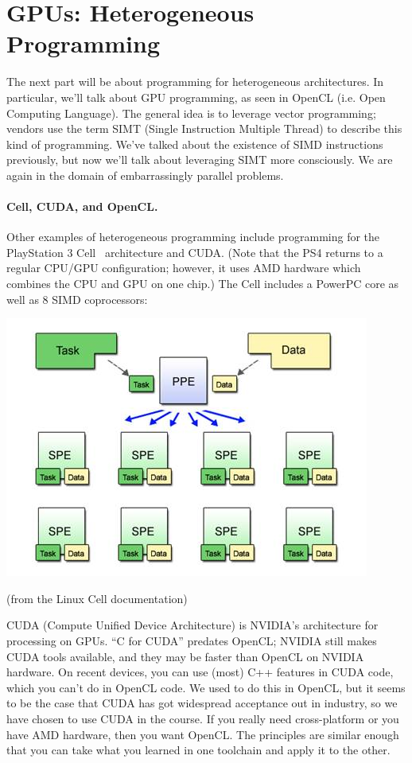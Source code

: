 




\section*{GPUs: Heterogeneous Programming}

The next part will be about programming for heterogeneous
architectures. In particular, we'll talk about GPU programming, as
seen in OpenCL (i.e. Open Computing Language). The general idea is to
leverage vector programming; vendors use the term SIMT (Single
Instruction Multiple Thread) to describe this kind of
programming. We've talked about the existence of SIMD instructions
previously, but now we'll talk about leveraging SIMT more
consciously. We are again in the domain of embarrassingly parallel
problems.

\paragraph{Cell, CUDA, and OpenCL.} 
Other examples of heterogeneous programming include
programming for the PlayStation 3 Cell~\cite{cellprimer} architecture and CUDA. (Note that the PS4 returns to a regular CPU/GPU configuration; however, it uses AMD hardware which combines the CPU and GPU on one chip.) The Cell includes a PowerPC core as well as
8 SIMD coprocessors:

\begin{center}
\includegraphics[width=.4\textwidth]{images/cell.jpg}
\end{center}
\hfill (from the Linux Cell documentation)

CUDA (Compute Unified Device Architecture) is NVIDIA's architecture
for processing on GPUs. ``C for CUDA'' predates OpenCL; NVIDIA still
makes CUDA tools available, and they may be faster than OpenCL on NVIDIA
hardware. On recent devices, you can use (most) C++ features in CUDA code,
which you can't do in OpenCL code. We used to do this in OpenCL, but it seems
to be the case that CUDA has got widespread acceptance out in industry, so we
have chosen to use CUDA in the course. If you really need cross-platform or 
you have AMD hardware, then you want OpenCL. The principles are similar 
enough that you can take what you learned in one toolchain and apply it 
to the other.

